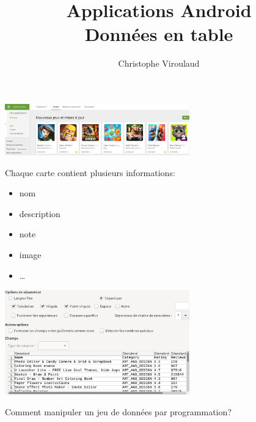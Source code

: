 \documentclass[svgnames,11pt]{beamer}
\author[]{Christophe Viroulaud}
\title{Applications Android\\
Données en table}
\date{\framebox{\textbf{Tab 01}}}
\institute{Première - NSI}
\begin{document}
\begin{frame}
    \titlepage
\end{frame}

\begin{frame}
    \begin{center}
        \centering
        \includegraphics[width=8cm]{ressources/playstore.png}
        \label{IMG}
    \end{center}
    \begin{center}
        Chaque carte contient plusieurs informations:
        \begin{itemize}
            \item nom
            \item description
            \item note
            \item image
            \item \dots
        \end{itemize}
    \end{center}
\end{frame}

\begin{frame}
    \begin{center}
        \centering
        \includegraphics[width=8cm]{ressources/jeu-donnees.png}
        \label{IMG}
    \end{center}
    \begin{framed}
        \centering Comment manipuler un jeu de données par programmation?
    \end{framed}

\end{frame}
\end{document}
